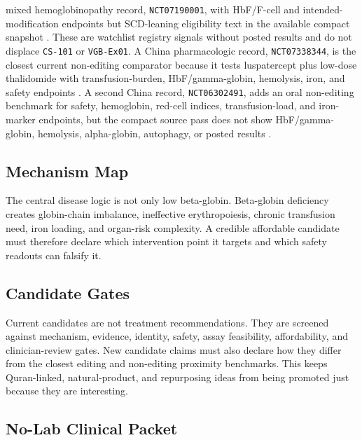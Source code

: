 mixed hemoglobinopathy record, \texttt{NCT07190001}, with HbF/F-cell and
intended-modification endpoints but SCD-leaning eligibility text in the
available compact snapshot
\cite{clinicaltrials2026yolt204Tdt,clinicaltrials2026yolt204Hemoglobinopathies}.
These are watchlist registry signals without posted results and do not
displace \texttt{CS-101} or \texttt{VGB-Ex01}. A China pharmacologic record,
\texttt{NCT07338344}, is the closest current non-editing comparator because it
tests luspatercept plus low-dose thalidomide with transfusion-burden,
HbF/gamma-globin, hemolysis, iron, and safety endpoints
\cite{clinicaltrials2026luspaterceptThalidomide}. A second China record,
\texttt{NCT06302491}, adds an oral non-editing benchmark for safety,
hemoglobin, red-cell indices, transfusion-load, and iron-marker endpoints, but
the compact source pass does not show HbF/gamma-globin, hemolysis,
alpha-globin, autophagy, or posted results \cite{clinicaltrials2026and017}.



\subsection{Mechanism Map}

The central disease logic is not only low beta-globin. Beta-globin deficiency
creates globin-chain imbalance, ineffective erythropoiesis, chronic transfusion
need, iron loading, and organ-risk complexity. A credible affordable candidate
must therefore declare which intervention point it targets and which safety
readouts can falsify it.



\subsection{Candidate Gates}

Current candidates are not treatment recommendations. They are screened against
mechanism, evidence, identity, safety, assay feasibility, affordability, and
clinician-review gates. New candidate claims must also declare how they differ
from the closest editing and non-editing proximity benchmarks. This keeps
Quran-linked, natural-product, and repurposing ideas from being promoted just
because they are interesting.



\subsection{No-Lab Clinical Packet}

